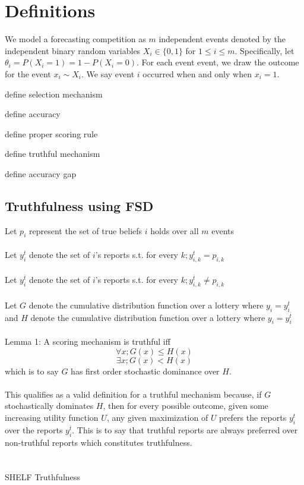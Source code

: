 \documentclass[letterpaper,12pt]{article}
\renewenvironment{abstract}
 {
  \begin{center}
  \vspace{3em} \bfseries \abstractname\vspace{0em}\vspace{0pt}
  \end{center}
  \list{}{%
    \setlength{\leftmargin}{20mm}%
    \setlength{\rightmargin}{\leftmargin}%
  }%
  \item\relax}
 {\endlist}
\newcommand{\1}{\mathbbm{1}}
\begin{document}


 


\section{Definitions}
We model a forecasting competition as $m$ independent events denoted by the independent binary random variables $X_i \in \{0, 1\}$ for $1 \leq i \leq m$. Specifically, let $\theta_i = P(X_i = 1) = 1 - P(X_i = 0)$. For each event event, we draw the outcome for the event $x_i \sim X_i$. We say event $i$ occurred when and only when $x_i = 1$. 

define selection mechanism

define accuracy

define proper scoring rule

define truthful mechanism

define accuracy gap

\subsection{Truthfulness using FSD}
Let $p_i$ represent the set of true beliefs $i$ holds over all $m$ events\\\\
Let $y_{i}^{t}$ denote the set of $i$'s reports s.t. for every $k; y_{i,k}^{t} = p_{i,k}$\\\\
Let $y_{i}^{\overline{t}}$ denote the set of $i$'s reports s.t. for every $k; y_{i,k}^{\overline{t}} \ne p_{i,k}$\\\\
Let $G$ denote the cumulative distribution function over a lottery where $y_i = y_{i}^{t}$ and $H$ denote the cumulative distribution function over a lottery where $y_i = y_{i}^{\overline{t}}$\\\\
Lemma 1: A scoring mechanism is truthful iff 
$$\forall x; G(x) \le H(x)$$
$$\exists x; G(x) < H(x)$$ 
which is to say $G$ has first order stochastic dominance over $H$.\\\\
This qualifies as a valid definition for a truthful mechanism because, if $G$ stochastically dominates $H$, then for every possible outcome, given some increasing utility function $U$, any given maximization of $U$ prefers the reports $y_{i}^{t}$ over the reports $y_{i}^{\overline{t}}$. This is to say that truthful reports are always preferred over non-truthful reports which constitutes truthfulness.\\\\\\
SHELF Truthfulness\\\\
\end{document}
